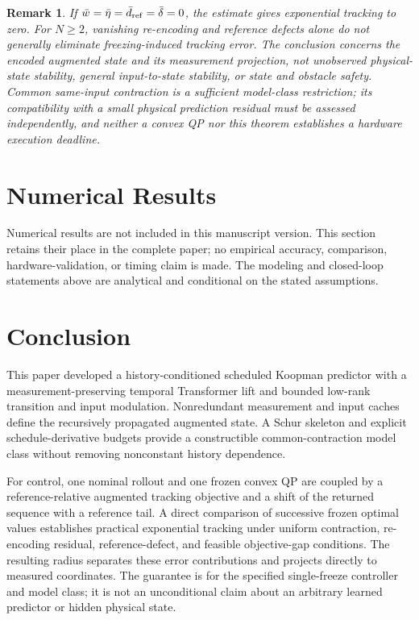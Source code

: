 \documentclass[journal]{IEEEtran}
\newtheorem{remark}{Remark}
\begin{document}
\begin{remark}
If $\bar w=\bar\eta=\bar d_{\rm ref}=\bar\delta=0$, the estimate gives exponential tracking to zero. For $N\ge2$, vanishing re-encoding and reference defects alone do not generally eliminate freezing-induced tracking error. The conclusion concerns the encoded augmented state and its measurement projection, not unobserved physical-state stability, general input-to-state stability, or state and obstacle safety. Common same-input contraction is a sufficient model-class restriction; its compatibility with a small physical prediction residual must be assessed independently, and neither a convex QP nor this theorem establishes a hardware execution deadline.
\end{remark}

\section{Numerical Results}
\label{sec:experiments}
Numerical results are not included in this manuscript version. This section retains their place in the complete paper; no empirical accuracy, comparison, hardware-validation, or timing claim is made. The modeling and closed-loop statements above are analytical and conditional on the stated assumptions.

\section{Conclusion}
\label{sec:conclusion}
This paper developed a history-conditioned scheduled Koopman predictor with a measurement-preserving temporal Transformer lift and bounded low-rank transition and input modulation. Nonredundant measurement and input caches define the recursively propagated augmented state. A Schur skeleton and explicit schedule-derivative budgets provide a constructible common-contraction model class without removing nonconstant history dependence.

For control, one nominal rollout and one frozen convex QP are coupled by a reference-relative augmented tracking objective and a shift of the returned sequence with a reference tail. A direct comparison of successive frozen optimal values establishes practical exponential tracking under uniform contraction, re-encoding residual, reference-defect, and feasible objective-gap conditions. The resulting radius separates these error contributions and projects directly to measured coordinates. The guarantee is for the specified single-freeze controller and model class; it is not an unconditional claim about an arbitrary learned predictor or hidden physical state.
\end{document}
